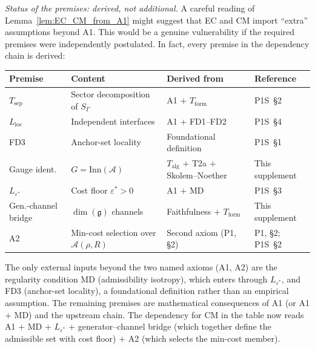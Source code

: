 \documentclass[11pt]{article}
\theoremstyle{definition}
\begin{document}
\noindent\textit{Status of the premises: derived, not additional.}\quad
A careful reading of Lemma~\ref{lem:EC_CM_from_A1} might suggest that
EC and CM import ``extra'' assumptions beyond A1.  This would be a
genuine vulnerability if the required premises were independently
postulated.  In fact, every premise in the dependency chain is derived:
\begin{center}\small
\renewcommand{\arraystretch}{1.15}
\begin{tabular}{@{}p{3.0cm}p{3.5cm}p{3.5cm}p{2.5cm}@{}}
\toprule
\textbf{Premise} & \textbf{Content} & \textbf{Derived from} & \textbf{Reference} \\
\midrule
$T_{\mathrm{sep}}$ & Sector decomposition of $S_\Gamma$ &
  A1 $+$ $T_{\mathrm{form}}$ & P1S~\S2 \\
$L_{\mathrm{loc}}$ & Independent interfaces &
  A1 $+$ FD1--FD2 & P1S~\S4 \\
FD3 & Anchor-set locality &
  Foundational definition & P1S~\S1 \\
Gauge ident. & $G = \mathrm{Inn}(\mathcal{A})$ &
  $T_{\mathrm{alg}}$ $+$ T2a $+$ Skolem--Noether & This supplement \\
$L_{\varepsilon^*}$ & Cost floor $\varepsilon^* > 0$ &
  A1 $+$ MD & P1S~\S3 \\
Gen.-channel bridge & $\dim(\mathfrak{g})$ channels &
  Faithfulness $+$ $T_{\mathrm{form}}$ & This supplement \\
A2 & Min-cost selection over $\mathcal{A}(\rho, R)$ &
  Second axiom (P1, \S2) & P1, \S2; P1S~\S2 \\
\bottomrule
\end{tabular}
\end{center}
\noindent The only external inputs beyond the two named axioms (A1, A2)
are the regularity condition MD (admissibility isotropy), which enters
through $L_{\varepsilon^*}$, and FD3 (anchor-set locality), a
foundational definition rather than an empirical assumption.  The
remaining premises are mathematical consequences of A1 (or A1 $+$ MD)
and the upstream chain.  The dependency for CM in the table now reads
A1 $+$ MD $+$ $L_{\varepsilon^*}$ $+$ generator--channel bridge (which
together define the admissible set with cost floor) $+$ A2 (which
selects the min-cost member).
\end{document}
